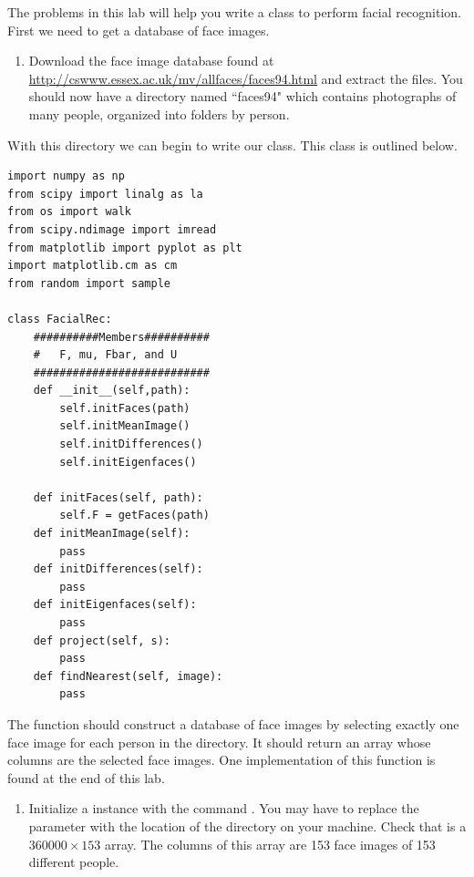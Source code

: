 \begin{problem}
\label{prob:getTrainingFaces}
The problems in this lab will help you write a class  to perform facial recognition. 
First we need to get a database of face images.
\begin{enumerate}
\item Download the  face image database found at \url{http://cswww.essex.ac.uk/mv/allfaces/faces94.html} and extract the files.
You should now have a directory named ``faces94" which contains photographs of many people, organized into folders by person.
\end{enumerate}
With this directory we can begin to write our  class. This class is outlined below.
\begin{lstlisting}
import numpy as np
from scipy import linalg as la
from os import walk
from scipy.ndimage import imread
from matplotlib import pyplot as plt
import matplotlib.cm as cm 
from random import sample

class FacialRec:
    ##########Members##########
    #   F, mu, Fbar, and U 
    ###########################
    def __init__(self,path):
        self.initFaces(path)
        self.initMeanImage()
        self.initDifferences()
        self.initEigenfaces()

    def initFaces(self, path):
        self.F = getFaces(path)
    def initMeanImage(self):
        pass
    def initDifferences(self):
        pass
    def initEigenfaces(self):
        pass
    def project(self, s):
        pass
    def findNearest(self, image):
        pass
\end{lstlisting}

The function  should construct a database of face images by selecting exactly one face image for each person in the directory.
It should return an array whose columns are the selected face images.
One implementation of this function is found at the end of this lab.

\begin{enumerate}[resume]
\item Initialize a  instance with the command . You may have to replace the parameter  with the location of the directory  on your machine. Check that  is a $360000 \times 153$ array. The columns of this array are 153 face images of 153 different people.
\end{enumerate}
\end{problem}


